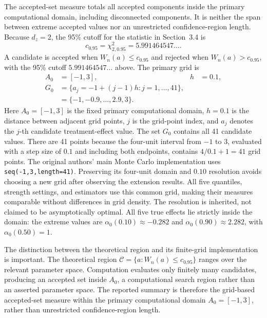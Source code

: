 The accepted-set measure totals all accepted components inside the primary computational domain, including disconnected components. It is neither the span between extreme accepted values nor an unrestricted confidence-region length. Because $d_z=2$, the 95\% cutoff for the statistic in Section~3.4 is
\begin{equation}
  c_{0.95}=\chi^2_{2,0.95}=5.991464547\ldots.
  \label{eq:wn-critical-value}
\end{equation}
A candidate is accepted when $W_n(a)\leq c_{0.95}$ and rejected when $W_n(a)>c_{0.95}$, with the 95\% cutoff $5.991464547\ldots$ above. The primary grid is
\begin{equation}
  \begin{aligned}
    A_0&=[-1,3],
    &h&=0.1,\\
    G_0&=\{a_j=-1+(j-1)h:j=1,\ldots,41\},\\
       &=\{-1,-0.9,\ldots,2.9,3\}.
  \end{aligned}
  \label{eq:primary-grid}
\end{equation}
Here $A_0=[-1,3]$ is the fixed primary computational domain, $h=0.1$ is the distance between adjacent grid points, $j$ is the grid-point index, and $a_j$ denotes the $j$-th candidate treatment-effect value. The set $G_0$ contains all 41 candidate values. There are 41 points because the four-unit interval from $-1$ to $3$, evaluated with a step size of $0.1$ and including both endpoints, contains $4/0.1+1=41$ grid points. The original authors' main Monte Carlo implementation uses \texttt{seq(-1,3,length=41)}. Preserving its four-unit domain and $0.10$ resolution avoids choosing a new grid after observing the extension results. All five quantiles, strength settings, and estimators use this common grid, making their measures comparable without differences in grid density. The resolution is inherited, not claimed to be asymptotically optimal. All five true effects lie strictly inside the domain: the extreme values are $\alpha_0(0.10)\approx-0.282$ and $\alpha_0(0.90)\approx2.282$, with $\alpha_0(0.50)=1$.

The distinction between the theoretical region and its finite-grid implementation is important. The theoretical region $\mathcal C=\{a:W_n(a)\leq c_{0.95}\}$ ranges over the relevant parameter space. Computation evaluates only finitely many candidates, producing an accepted set inside $A_0$, a computational search region rather than an asserted parameter space. The reported summary is therefore the grid-based accepted-set measure within the primary computational domain $A_0=[-1,3]$, rather than unrestricted confidence-region length.

